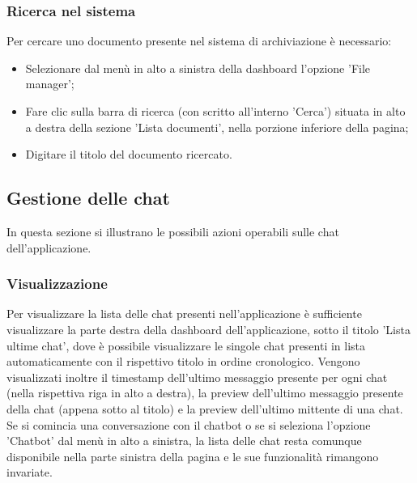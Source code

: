 \documentclass[10pt, a4paper]{article}
\begin{document}
\subsubsection{Ricerca nel sistema}
Per cercare uno documento presente nel sistema di archiviazione è necessario:
\begin{itemize}
    \item Selezionare dal menù in alto a sinistra della dashboard l'opzione 'File manager';
    \item Fare clic sulla barra di ricerca (con scritto all'interno 'Cerca') situata in alto a destra della sezione 'Lista documenti', nella porzione inferiore della pagina;
    \item Digitare il titolo del documento ricercato.
\end{itemize}

\subsection{Gestione delle chat}
In questa sezione si illustrano le possibili azioni operabili sulle chat dell'applicazione. 
\subsubsection{Visualizzazione}
Per visualizzare la lista delle chat presenti nell’applicazione è sufficiente visualizzare la parte destra della dashboard dell'applicazione, sotto il titolo 'Lista ultime chat', dove è possibile visualizzare le singole chat presenti in lista automaticamente con il rispettivo titolo in ordine cronologico. Vengono visualizzati inoltre il timestamp dell'ultimo messaggio presente per ogni chat (nella rispettiva riga in alto a destra), la preview dell'ultimo messaggio presente della chat (appena sotto al titolo) e la preview dell'ultimo mittente di una chat.\\ Se si comincia una conversazione con il chatbot o se si seleziona l'opzione 'Chatbot' dal menù in alto a sinistra, la lista delle chat resta comunque disponibile nella parte sinistra della pagina e le sue funzionalità rimangono invariate.
\end{document}

